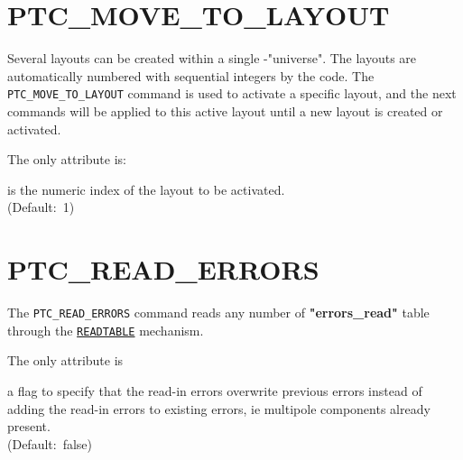 
\section{PTC\_MOVE\_TO\_LAYOUT}
\label{sec:ptc-move-to-layout}

Several \ptc layouts can be created within a single \ptc-"universe". 
The layouts are automatically numbered with sequential integers by the 
\madx code. The \texttt{PTC\_MOVE\_TO\_LAYOUT} command is used to
activate a specific layout, and the next \ptc commands will be
applied to this active \ptc layout until a new \ptc layout is created
or activated. 


The only attribute is:
\begin{madlist}
	 is the numeric index of the \ptc layout to be
	activated.\\ (Default:~1)
\end{madlist}

\section{PTC\_READ\_ERRORS}
\label{sec:ptc-read-errors}

The \texttt{PTC\_READ\_ERRORS} command reads any number of
\textbf{"errors\_read"} table through the 
\hyperref[sec:readtable]{\texttt{READTABLE}} mechanism.


The only attribute is 
\begin{madlist}
    a flag to specify that the read-in errors
   overwrite previous errors instead of adding the read-in errors to
   existing errors, ie multipole components already present.\\
   (Default:~false)  
\end{madlist}

